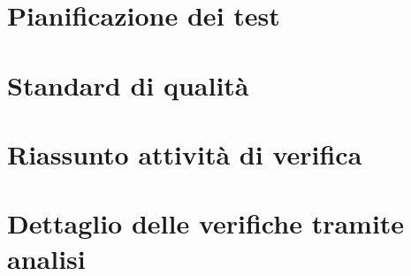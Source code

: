 \newpage
\section{Pianificazione dei test}


\appendix

\newpage
\section{Standard di qualità}

\label{standard}

\newpage
\section{Riassunto attività di verifica}


\newpage
\section{Dettaglio delle verifiche tramite analisi}




